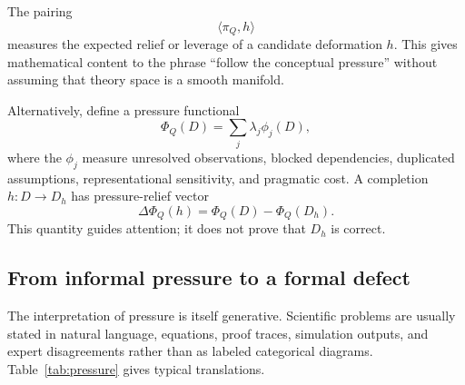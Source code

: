 \documentclass[11pt]{article}
\begin{document}
The pairing
\begin{equation}
\langle \pi_Q,h\rangle
\end{equation}
measures the expected relief or leverage of a candidate deformation $h$. This gives mathematical
content to the phrase ``follow the conceptual pressure'' without assuming that theory space is a
smooth manifold.

Alternatively, define a pressure functional
\begin{equation}
\Phi_Q(D)=\sum_{j}\lambda_j\phi_j(D),
\end{equation}
where the $\phi_j$ measure unresolved observations, blocked dependencies, duplicated assumptions,
representational sensitivity, and pragmatic cost. A completion $h:D\to D_h$ has pressure-relief vector
\begin{equation}
\Delta\Phi_Q(h)=\Phi_Q(D)-\Phi_Q(D_h).
\end{equation}
This quantity guides attention; it does not prove that $D_h$ is correct.

\subsection{From informal pressure to a formal defect}

The interpretation of pressure is itself generative. Scientific problems are usually stated in natural
language, equations, proof traces, simulation outputs, and expert disagreements rather than as labeled
categorical diagrams. Table~\ref{tab:pressure} gives typical translations.
\end{document}
